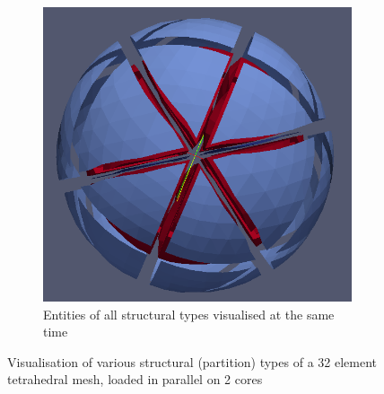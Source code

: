 \begin{figure}[H]
	\begin{subfigure}[b]{0.46\textwidth} \vspace{5mm} \hspace{12mm} \includegraphics[scale=0.21]{images/32-full}  \captionsetup{width=0.6\textwidth} \caption{ Entities of all structural types visualised at the same time } \end{subfigure}
	\caption{ Visualisation of various structural (partition) types of a 32 element tetrahedral mesh, loaded in parallel on 2 cores }
	\label{fig:result:spherestruct}
\end{figure}


